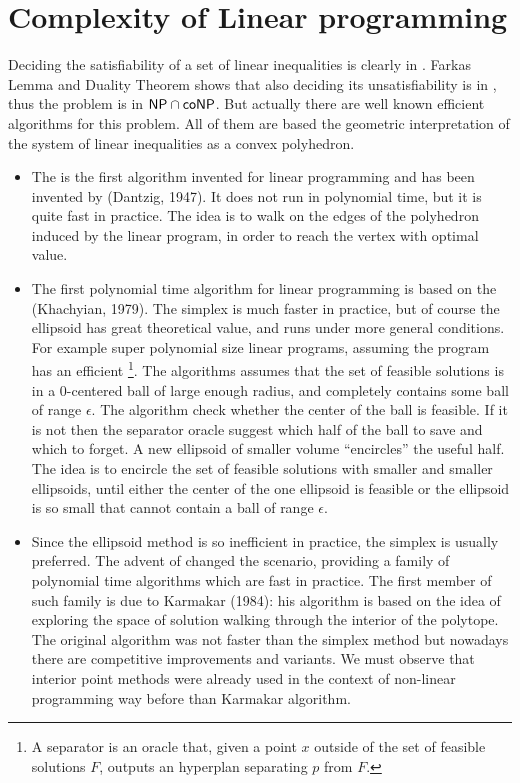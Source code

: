 \documentclass[a4paper,twoside,justified]{tufte-handout}
\begin{document}
\section{Complexity of Linear programming}

Deciding the satisfiability of a set of linear inequalities is clearly
in \NP\@.  Farkas Lemma and Duality Theorem shows that also deciding
its unsatisfiability is in \NP, thus the problem is in $ \mathsf{NP} \cap
\mathsf{coNP} $. But actually there are well known efficient algorithms for
this problem. All of them are based the geometric interpretation of
the system of linear inequalities as a convex polyhedron. 
\begin{itemize}
  \item The  is the first algorithm
  invented for linear programming and has been invented by (Dantzig,
  1947). It does not run in polynomial time, but it is quite fast in
  practice. The idea is to walk on the edges of the polyhedron induced
  by the linear program, in order to reach the vertex with optimal
  value.
  \item The first polynomial time algorithm for linear programming is
  based on the  (Khachyian, 1979). The
  simplex is much faster in practice, but of course the ellipsoid has
  great theoretical value, and runs under more general conditions. For
  example super polynomial size linear programs, assuming the program
  has an efficient \footnote{A separator is
    an oracle that, given a point $x$ outside of the set of feasible
    solutions $F$, outputs an hyperplan separating $ p$ from $ F$.}.
  The algorithms assumes that the set of feasible solutions is in a
  0-centered ball of large enough radius, and completely
  contains some ball of range $ \epsilon $.
  The algorithm check whether the center of the ball is feasible. If
  it is not then the separator oracle suggest which half of the ball
  to save and which to forget. A new ellipsoid of smaller volume
  ``encircles'' the useful half.  The idea is to encircle the set of
  feasible solutions with smaller and smaller ellipsoids, until either
  the center of the one ellipsoid is feasible or the ellipsoid is so
  small that cannot contain a ball of range $ \epsilon $.
  
  \item Since the ellipsoid method is so inefficient in practice, the
  simplex is usually preferred. The advent of  changed the scenario, providing a family of
  polynomial time algorithms which are fast in practice. The first
  member of such family is due to Karmakar (1984): his algorithm is
  based on the idea of exploring the space of solution walking through
  the interior of the polytope. The original algorithm was not faster
  than the simplex method but nowadays there are competitive
  improvements and variants. We must observe that interior point
  methods were already used in the context of non-linear programming
  way before than Karmakar algorithm.
\end{itemize}
\end{document}
